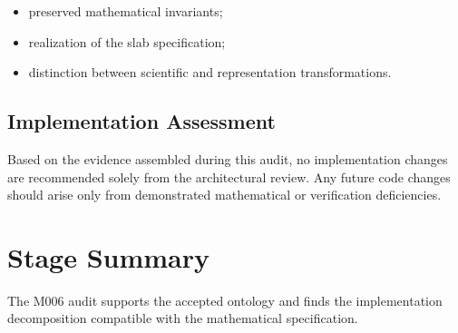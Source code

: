 \begin{itemize}
\item preserved mathematical invariants;
\item realization of the slab specification;
\item distinction between scientific and representation transformations.
\end{itemize}

\subsection{Implementation Assessment}

Based on the evidence assembled during this audit, no implementation changes
are recommended solely from the architectural review. Any future code changes
should arise only from demonstrated mathematical or verification deficiencies.

\section{Stage Summary}

The M006 audit supports the accepted ontology and finds the implementation
decomposition compatible with the mathematical specification.
